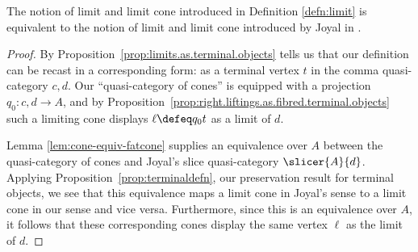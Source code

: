 \begin{prop}\label{prop:limits.are.limits}
The notion of limit and limit cone introduced in Definition \ref{defn:limit} is equivalent to the notion of limit and limit cone introduced by Joyal in \cite[4.5]{Joyal:2002:QuasiCategories}.
\end{prop}
\begin{proof}
By Proposition~\ref{prop:limits.as.terminal.objects} tells us that our definition can be recast in a corresponding form: as a terminal vertex $t$ in  the comma quasi-category $c\comma d$. Our ``quasi-category of cones'' is  equipped with a projection $q_0 \colon c \comma d \to A$, and by Proposition~\ref{prop:right.liftings.as.fibred.terminal.objects} such a limiting cone displays $\ell\defeq q_0t$ as a limit of $d$.

Lemma \ref{lem:cone-equiv-fatcone} supplies an equivalence over $A$ between the quasi-category of cones and Joyal's slice quasi-category $\slicer{A}{d}$. Applying Proposition~\ref{prop:terminaldefn}, our preservation result for terminal objects, we see that this equivalence maps a limit cone in Joyal's sense to a limit cone in our sense and vice versa. Furthermore, since this is an equivalence over $A$, it follows that these corresponding cones display the same vertex $\ell$ as the limit of $d$.
\end{proof}

